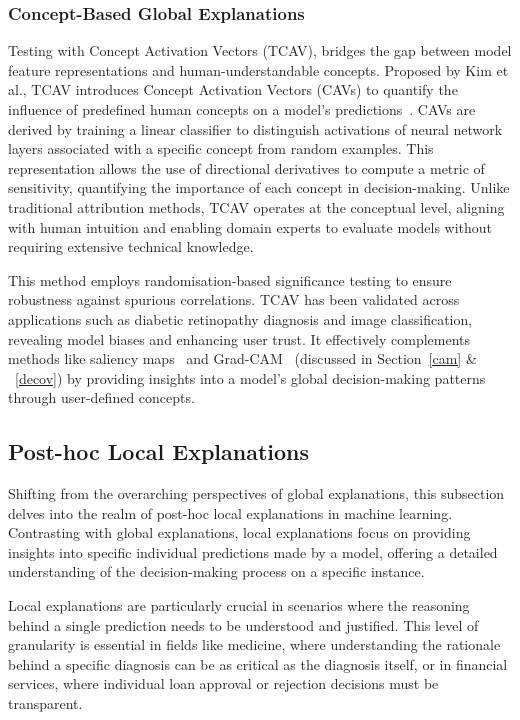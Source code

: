 \subsubsection{Concept-Based Global Explanations}

Testing with Concept Activation Vectors (TCAV), bridges the gap between model feature representations and human-understandable concepts. Proposed by Kim et al., TCAV introduces Concept Activation Vectors (CAVs) to quantify the influence of predefined human concepts on a model's predictions~\cite{KimWGCWVS18}. CAVs are derived by training a linear classifier to distinguish activations of neural network layers associated with a specific concept from random examples. This representation allows the use of directional derivatives to compute a metric of sensitivity, quantifying the importance of each concept in decision-making. Unlike traditional attribution methods, TCAV operates at the conceptual level, aligning with human intuition and enabling domain experts to evaluate models without requiring extensive technical knowledge.

This method employs randomisation-based significance testing to ensure robustness against spurious correlations. TCAV has been validated across applications such as diabetic retinopathy diagnosis and image classification, revealing model biases and enhancing user trust. It effectively complements methods like saliency maps~\cite{SpringenbergDBR14} and Grad-CAM~\cite{SelvarajuCDVPB20} (discussed in Section~\ref{cam} \& ~\ref{decov}) by providing insights into a model's global decision-making patterns through user-defined concepts.

\subsection{Post-hoc Local Explanations}

Shifting from the overarching perspectives of global explanations, this subsection delves into the realm of post-hoc local explanations in machine learning. Contrasting with global explanations, local explanations focus on providing insights into specific individual predictions made by a model, offering a detailed understanding of the decision-making process on a specific instance.

Local explanations are particularly crucial in scenarios where the reasoning behind a single prediction needs to be understood and justified. This level of granularity is essential in fields like medicine, where understanding the rationale behind a specific diagnosis can be as critical as the diagnosis itself, or in financial services, where individual loan approval or rejection decisions must be transparent.


